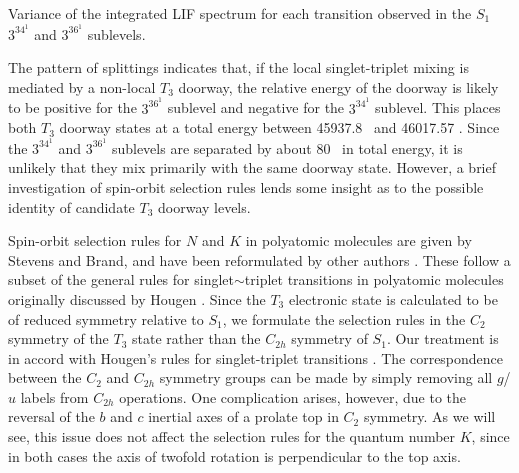 \documentclass[12pt]{mitthesis}
\begin{document}
\begin{table}
  \caption{Variance of the integrated LIF spectrum for each transition
    observed in the $S_1$ $3^34^1$  and $3^36^1$ 
    sublevels.}
  \label{table:lif-variances}

\end{table}

The pattern of splittings indicates that, if the local singlet-triplet
mixing is mediated by a non-local $T_3$ doorway, the relative energy
of the doorway is likely to be positive for the $3^36^1$ 
sublevel and negative for the $3^34^1$  sublevel.  This places
both $T_3$ doorway states at a total energy between 45937.8 \rcm\ and
46017.57 \rcm.  Since the $3^34^1$  and $3^36^1$ 
sublevels are separated by about 80 \rcm\ in total energy, it is
unlikely that they mix primarily with the same doorway state.
However, a brief investigation of spin-orbit selection rules lends
some insight as to the possible identity of candidate $T_3$ doorway
levels.

Spin-orbit selection rules for $N$ and $K$ in polyatomic molecules are
given by Stevens and Brand, and have been reformulated by other
authors \cite{stevens73, howard78, dupre84}.  These follow a subset of
the general rules for singlet$\sim$triplet transitions in polyatomic
molecules originally discussed by Hougen \cite{hougen64}.  Since the
$T_3$ electronic state is calculated to be of reduced symmetry
relative to $S_1$, we formulate the selection rules in the $C_2$
symmetry of the $T_3$ state rather than the $C_{2h}$ symmetry of
$S_1$.  Our treatment is in accord with Hougen's rules for
singlet-triplet transitions \cite{hougen64}.  The correspondence
between the $C_2$ and $C_{2h}$ symmetry groups can be made by simply
removing all $g$/$u$ labels from $C_{2h}$ operations.  One
complication arises, however, due to the reversal of the $b$ and $c$
inertial axes of a prolate top in $C_2$ symmetry.  As we will see,
this issue does not affect the selection rules for the quantum number
$K$, since in both cases the axis of twofold rotation is perpendicular
to the top axis.

\end{document}
